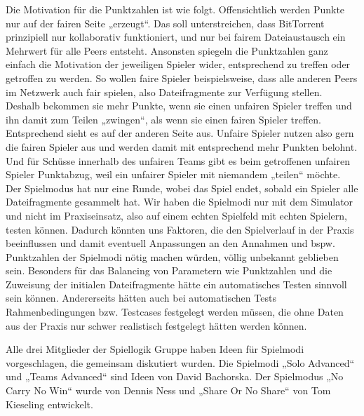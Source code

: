 Die Motivation für die Punktzahlen ist wie folgt. Offensichtlich werden Punkte nur auf der fairen Seite „erzeugt“. Das soll unterstreichen, dass BitTorrent prinzipiell nur kollaborativ funktioniert, und nur bei fairem Dateiaustausch ein Mehrwert für alle Peers entsteht. Ansonsten spiegeln die Punktzahlen ganz einfach die Motivation der jeweiligen Spieler wider, entsprechend zu treffen oder getroffen zu werden. So wollen faire Spieler beispielsweise, dass alle anderen Peers im Netzwerk auch fair spielen, also Dateifragmente zur Verfügung stellen. Deshalb bekommen sie mehr Punkte, wenn sie einen unfairen Spieler treffen und ihn damit zum Teilen „zwingen“, als wenn sie einen fairen Spieler treffen. Entsprechend sieht es auf der anderen Seite aus. Unfaire Spieler nutzen also gern die fairen Spieler aus und werden damit mit entsprechend mehr Punkten belohnt. Und für Schüsse innerhalb des unfairen Teams gibt es beim getroffenen unfairen Spieler Punktabzug, weil ein unfairer Spieler mit niemandem „teilen“ möchte.
Der Spielmodus hat nur eine Runde, wobei das Spiel endet, sobald ein Spieler alle Dateifragmente gesammelt hat.
Wir haben die Spielmodi nur mit dem Simulator und nicht im Praxiseinsatz, also auf einem echten Spielfeld mit echten Spielern, testen können. Dadurch könnten uns Faktoren, die den Spielverlauf in der Praxis beeinflussen und damit eventuell Anpassungen an den Annahmen und bspw. Punktzahlen der Spielmodi nötig machen würden, völlig unbekannt geblieben sein. Besonders für das Balancing von Parametern wie Punktzahlen und die Zuweisung der initialen Dateifragmente hätte ein automatisches Testen sinnvoll sein können. Andererseits hätten auch bei automatischen Tests Rahmenbedingungen bzw. Testcases festgelegt werden müssen, die ohne Daten aus der Praxis nur schwer realistisch festgelegt hätten werden können.

Alle drei Mitglieder der Spiellogik Gruppe haben Ideen für Spielmodi vorgeschlagen, die gemeinsam diskutiert wurden. Die Spielmodi „Solo Advanced“ und „Teams Advanced“ sind Ideen von David Bachorska. Der Spielmodus „No Carry No Win“ wurde von Dennis Ness und „Share Or No Share“ von Tom Kieseling entwickelt.
